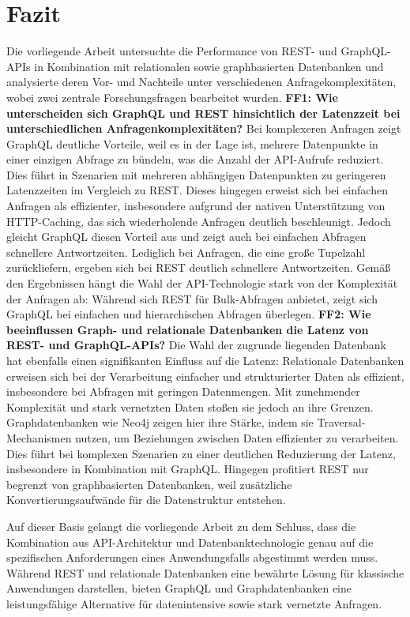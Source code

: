 \chapter{Fazit} %
\label{sec:fazit}
Die vorliegende Arbeit untersuchte die Performance von REST- und GraphQL-APIs in Kombination mit relationalen sowie graphbasierten Datenbanken und analysierte deren Vor- und Nachteile unter verschiedenen Anfragekomplexitäten, wobei zwei zentrale Forschungsfragen bearbeitet wurden.
\newline
\noindent
\textbf{FF1: Wie unterscheiden sich GraphQL und REST hinsichtlich der Latenzzeit bei unterschiedlichen Anfragenkomplexitäten?}
Bei komplexeren Anfragen zeigt GraphQL deutliche Vorteile, weil es in der Lage ist, mehrere Datenpunkte in einer einzigen Abfrage zu bündeln, was die Anzahl der API-Aufrufe reduziert. Dies führt in Szenarien mit mehreren abhängigen Datenpunkten zu geringeren Latenzzeiten im Vergleich zu REST. Dieses hingegen erweist sich bei einfachen Anfragen als effizienter, insbesondere aufgrund der nativen Unterstützung von HTTP-Caching, das sich wiederholende Anfragen deutlich beschleunigt. Jedoch gleicht GraphQL diesen Vorteil aus und zeigt auch bei einfachen Abfragen schnellere Antwortzeiten. Lediglich bei Anfragen, die eine große Tupelzahl zurückliefern, ergeben sich bei REST deutlich schnellere Antwortzeiten. Gemäß den Ergebnissen hängt die Wahl der API-Technologie stark von der Komplexität der Anfragen ab: Während sich REST für Bulk-Abfragen anbietet, zeigt sich GraphQL bei einfachen und hierarchischen Abfragen überlegen. 
\newline
\noindent
\textbf{FF2: Wie beeinflussen Graph- und relationale Datenbanken die Latenz von REST- und GraphQL-APIs?}
Die Wahl der zugrunde liegenden Datenbank hat ebenfalls einen signifikanten Einfluss auf die Latenz: Relationale Datenbanken erweisen sich bei der Verarbeitung einfacher und strukturierter Daten als effizient, insbesondere bei Abfragen mit geringen Datenmengen. Mit zunehmender Komplexität und stark vernetzten Daten stoßen sie jedoch an ihre Grenzen. Graphdatenbanken wie Neo4j zeigen hier ihre Stärke, indem sie Traversal-Mechanismen nutzen, um Beziehungen zwischen Daten effizienter zu verarbeiten. Dies führt bei komplexen Szenarien zu einer deutlichen Reduzierung der Latenz, insbesondere in Kombination mit GraphQL. Hingegen profitiert REST nur begrenzt von graphbasierten Datenbanken, weil zusätzliche Konvertierungsaufwände für die Datenstruktur entstehen.

\vspace{1em} 
\noindent
Auf dieser Basis gelangt die vorliegende Arbeit zu dem Schluss, dass die Kombination aus API-Architektur und Datenbanktechnologie genau auf die spezifischen Anforderungen eines Anwendungsfalls abgestimmt werden muss. Während REST und relationale Datenbanken eine bewährte Lösung für klassische Anwendungen darstellen, bieten GraphQL und Graphdatenbanken eine leistungsfähige Alternative für datenintensive sowie stark vernetzte Anfragen.




